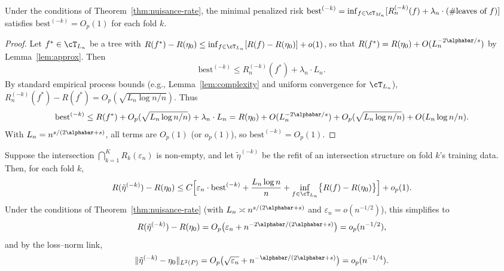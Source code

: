 \documentclass[12pt]{article}
\begin{document}
\begin{lemma}
\label{lem:best-bounded}
Under the conditions of Theorem~\ref{thm:nuisance-rate}, the minimal penalized risk $\text{best}^{(-k)} = \inf_{f \in \cT_{M_n}} [ R_n^{(-k)}(f) + \lambda_n \cdot (\#\text{leaves of } f) ]$ satisfies $\text{best}^{(-k)} = O_p(1)$ for each fold $k$.
\end{lemma}

\begin{proof}
Let $f^* \in \cT_{L_n}$ be a tree with $R(f^*) - R(\eta_0) \le \inf_{f \in \cT_{L_n}}[R(f) - R(\eta_0)] + o(1)$, so that $R(f^*) = R(\eta_0) + O(L_n^{-2\alphabar/s})$ by Lemma~\ref{lem:approx}. Then
\[
\text{best}^{(-k)} \le R_n^{(-k)}(f^*) + \lambda_n \cdot L_n.
\]
By standard empirical process bounds (e.g., Lemma~\ref{lem:complexity} and uniform convergence for $\cT_{L_n}$), $R_n^{(-k)}(f^*) - R(f^*) = O_p(\sqrt{L_n \log n / n})$. Thus
\[
\text{best}^{(-k)} \le R(f^*) + O_p(\sqrt{L_n \log n / n}) + \lambda_n \cdot L_n = R(\eta_0) + O(L_n^{-2\alphabar/s}) + O_p(\sqrt{L_n \log n / n}) + O(L_n \log n / n).
\]
With $L_n = n^{s/(2\alphabar+s)}$, all terms are $O_p(1)$ (or $o_p(1)$), so $\text{best}^{(-k)} = O_p(1)$.
\end{proof}

\begin{lemma}
\label{lem:intersection-bias}
Suppose the intersection $\bigcap_{k=1}^K R_k(\varepsilon_n)$ is non-empty, and let $\tilde{\eta}^{(-k)}$ be the refit of an intersection structure on fold $k$'s training data. Then, for each fold $k$,
\[
R(\tilde{\eta}^{(-k)}) - R(\eta_0) \le C \Bigl[ \varepsilon_n \cdot \text{best}^{(-k)} + \frac{L_n \log n}{n} + \inf_{f \in \cT_{L_n}} \bigl\{ R(f) - R(\eta_0) \bigr\} \Bigr] + o_p(1).
\]
Under the conditions of Theorem~\ref{thm:nuisance-rate} (with $L_n \asymp n^{s/(2\alphabar+s)}$ and $\varepsilon_n = o(n^{-1/2})$), this simplifies to
\[
R(\tilde{\eta}^{(-k)}) - R(\eta_0) = O_p\bigl( \varepsilon_n + n^{-2\alphabar/(2\alphabar+s)} \bigr) = o_p(n^{-1/2}),
\]
and by the loss--norm link,
\[
\|\tilde{\eta}^{(-k)} - \eta_0\|_{L^2(P)} = O_p\bigl( \sqrt{\varepsilon_n} + n^{-\alphabar/(2\alphabar+s)} \bigr) = o_p(n^{-1/4}).
\]
\end{lemma}
\end{document}
